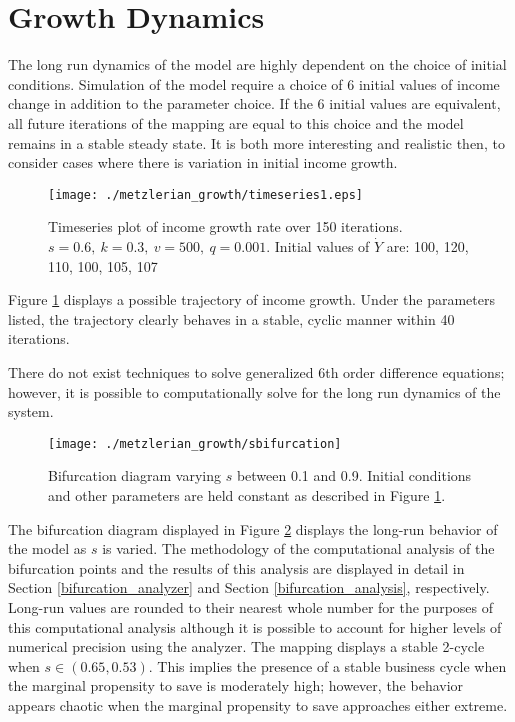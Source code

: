 \section{Growth Dynamics}
The long run dynamics of the model are highly dependent on the choice of initial conditions. Simulation of the model require a choice of 6 initial values of income change in addition to the parameter choice. If the 6 initial values are equivalent, all future iterations of the mapping are equal to this choice and the model remains in a stable steady state. It is both more interesting and realistic then, to consider cases where there is variation in initial income growth.
\begin{figure}[ht]
    \centering
    \texttt{[image: ./metzlerian\_growth/timeseries1.eps]}
    \caption{Timeseries plot of income growth rate over 150 iterations. $s=0.6,\ k=0.3,\ v=500,\ q=0.001$. Initial values of $\dot Y$ are: 100, 120, 110, 100, 105, 107}
    \label{metzlerian_growth-timeseries1}
\end{figure}
Figure \ref{metzlerian_growth-timeseries1} displays a possible trajectory of income growth. Under the parameters listed, the trajectory clearly behaves in a stable, cyclic manner within 40 iterations. 

There do not exist techniques to solve generalized 6th order difference equations; however, it is possible to computationally solve for the long run dynamics of the system.
\begin{figure}
    \centering
    \texttt{[image: ./metzlerian\_growth/sbifurcation]}
    \caption{Bifurcation diagram varying $s$ between 0.1 and 0.9. Initial conditions and other parameters are held constant as described in Figure \ref{metzlerian_growth-timeseries1}.}
    \label{metzlerian_growth-sbifurcation}
\end{figure} The bifurcation diagram displayed in Figure \ref{metzlerian_growth-sbifurcation} displays the long-run behavior of the model as $s$ is varied. The methodology of the computational analysis of the bifurcation points and the results of this analysis are displayed in detail in Section \ref{bifurcation_analyzer} and Section \ref{bifurcation_analysis}, respectively. Long-run values are rounded to their nearest whole number for the purposes of this computational analysis although it is possible to account for higher levels of numerical precision using the analyzer. The mapping displays a stable 2-cycle when $s\in(0.65, 0.53)$. This implies the presence of a stable business cycle when the marginal propensity to save is moderately high; however, the behavior appears chaotic when the marginal propensity to save approaches either extreme. 

